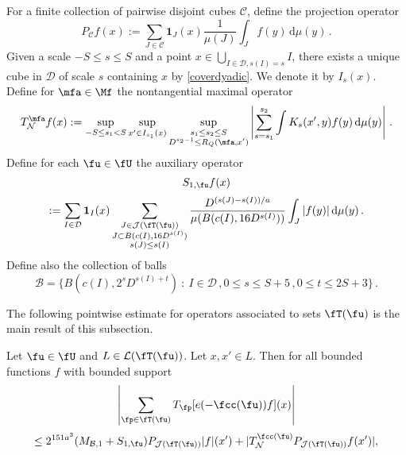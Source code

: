 For a finite collection of pairwise disjoint cubes $\mathcal{C}$, define the projection operator
$$
    P_{\mathcal{C}}f(x) :=\sum_{J\in\mathcal{C}}\mathbf{1}_J(x) \frac{1}{\mu(J)}\int_J f(y) \, \mathrm{d}\mu(y)\,.
$$
Given a scale $-S \le s\le S$ and a point $x \in \bigcup_{I\in \mathcal{D}, s(I) = s} I$, there exists a unique cube in $\mathcal{D}$ of scale $s$ containing $x$ by \eqref{coverdyadic}. We denote it by $I_s(x)$. Define for $\mfa \in \Mf$ the nontangential maximal operator
\begin{equation}
    \label{eq-TN-def}
    T_{\mathcal{N}}^\mfa f(x) := \sup_{-S \le s_1 < S} \sup_{x' \in I_{s_1}(x)} \sup_{\substack{s_1 \le s_2 \le S\\ D^{s_2-1} \le R_Q(\mfa, x')}} \left| \sum_{s = s_1}^{s_2} \int K_s(x',y) f(y) \, \mathrm{d}\mu(y) \right|\,.
\end{equation}
Define for each $\fu \in \fU$ the auxiliary operator
$$
    S_{1,\fu}f(x)
$$
\begin{equation}
    \label{eq-def-S-op}
    :=\sum_{I\in\mathcal{D}} \mathbf{1}_{I}(x) \sum_{\substack{J\in \mathcal{J}(\fT(\fu))\\
    J\subset B(c(I), 16 D^{s(I)})\\ s(J) \le s(I)}} \frac{D^{(s(J) - s(I))/a}}{\mu(B(c(I), 16D^{s(I)}))}\int_J |f(y)| \, \mathrm{d}\mu(y)\,.
\end{equation}
Define also the collection of balls
$$
    \mathcal{B} = \{B(c(I), 2^s D^{s(I)+t}) \ : \ I \in \mathcal{D}\,, 0 \le s \le S + 5\,, 0 \le t \le 2S+3\}\,.
$$

The following pointwise estimate for operators associated to sets $\fT(\fu)$ is the main result of this subsection.

\begin{lemma}
    \label{pointwise-tree-estimate}
    \leanok
    Let $\fu \in \fU$ and $L \in \mathcal{L}(\fT(\fu))$. Let $x, x' \in L$.
    Then for all bounded functions $f$ with bounded support
    $$
        \left|\sum_{\fp \in \fT(\fu)} T_{\fp}[ e(-\fcc(\fu))f](x)\right|
    $$
    \begin{equation}
        \label{eq-LJ-ptwise}
        \leq 2^{151a^3}(M_{\mathcal{B},1}+S_{1,\fu})P_{\mathcal{J}(\fT(\fu))}|f|(x')+|T_{\mathcal{N}}^{\fcc(\fu)} P_{\mathcal{J}(\fT(\fu))}f(x')|,
    \end{equation}
\end{lemma}

